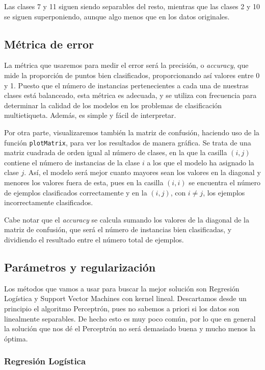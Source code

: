 \documentclass[a4]{article}
\begin{document}
Las clases 7 y 11 siguen siendo separables del resto, mientras que las clases 2 y 10 se siguen superponiendo, aunque algo menos que en los datos originales.

\subsection{Métrica de error}

La métrica que usaremos para medir el error será la precisión, o \textit{accuracy}, que mide la proporción de puntos bien clasificados, proporcionando así valores entre 0 y 1. Puesto que el número de instancias pertenecientes a cada una de nuestras clases está balanceado, esta métrica es adecuada, y se utiliza con frecuencia para determinar la calidad de los modelos en los problemas de clasificación multietiqueta. Además, es simple y fácil de interpretar. 

Por otra parte, visualizaremos también la matriz de confusión, haciendo uso de la función \lstinline|plotMatrix|, para ver los resultados de manera gráfica.  Se trata de una matriz cuadrada de orden igual al número de clases, en la que la casilla $(i,j)$ contiene el número de instancias de la clase $i$ a los que el modelo ha asignado la clase $j$.  Así, el modelo será mejor cuanto mayores sean los valores en la diagonal y menores los valores fuera de esta, pues en la casilla $(i,i)$ se encuentra el número de ejemplos clasificados correctamente y en la $(i,j)$, con $i\neq j$, los ejemplos incorrectamente clasificados. 

Cabe notar que el \textit{accuracy} se calcula sumando los valores de la diagonal de la matriz de confusión, que será el número de instancias bien clasificadas, y dividiendo el resultado entre el número total de ejemplos. 

\subsection{Parámetros y regularización}

Los métodos que vamos a usar para buscar la mejor solución son Regresión Logística y Support Vector Machines con kernel lineal. Descartamos desde un principio el algoritmo Perceptrón, pues no sabemos a priori si los datos son linealmente separables. De hecho esto es muy poco común, por lo que en general la solución que nos dé el Perceptrón no será demasiado buena y mucho menos la óptima. 

\subsubsection{Regresión Logística}
\end{document}
